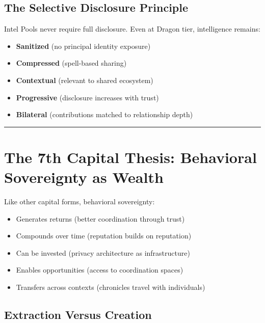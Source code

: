 \documentclass[
]{article}
\begin{document}
\subsection{The Selective Disclosure
Principle}\label{the-selective-disclosure-principle}

Intel Pools never require full disclosure. Even at Dragon tier,
intelligence remains:

\begin{itemize}
\item
  \textbf{Sanitized} (no principal identity exposure)
\item
  \textbf{Compressed} (spell-based sharing)
\item
  \textbf{Contextual} (relevant to shared ecosystem)
\item
  \textbf{Progressive} (disclosure increases with trust)
\item
  \textbf{Bilateral} (contributions matched to relationship depth)
\end{itemize}

\begin{center}\rule{0.5\linewidth}{0.5pt}\end{center}

\section{The 7th Capital Thesis: Behavioral Sovereignty as
Wealth}\label{the-7th-capital-thesis-behavioral-sovereignty-as-wealth}

Like other capital forms, behavioral sovereignty:

\begin{itemize}
\item
  Generates returns (better coordination through trust)
\item
  Compounds over time (reputation builds on reputation)
\item
  Can be invested (privacy architecture as infrastructure)
\item
  Enables opportunities (access to coordination spaces)
\item
  Transfers across contexts (chronicles travel with individuals)
\end{itemize}

\subsection{Extraction Versus
Creation}\label{extraction-versus-creation}
\end{document}
